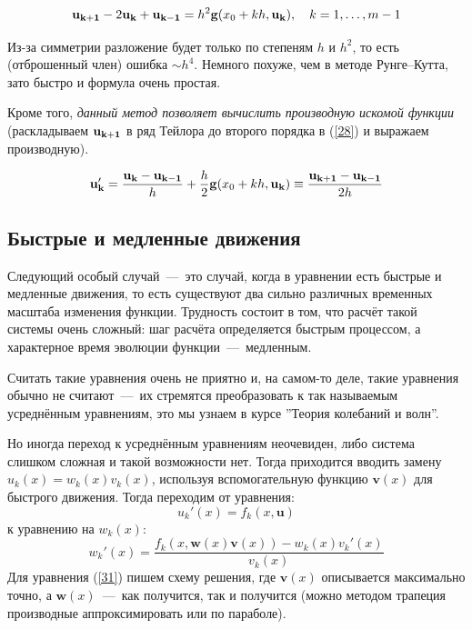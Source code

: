 \documentclass[a4paper,9pt,russian]{article}
\begin{document}
    \begin{equation}\label{28}
     {\bf u_{k+1}} - 2{\bf u_k} + {\bf u_{k-1}} = h^2{\bf g}(x_0 + kh, {\bf u_k}),\ \ \ k = 1, \ldots, m-1
    \end{equation}
    \par
    Из-за симметрии разложение будет только по степеням $h$ и $h^2$, то есть (отброшенный член) {ошибка $\sim h^4$. Немного похуже, чем в методе} {Рунге--Кутта, зато быстро и формула очень простая.}\par
    Кроме того, {\it данный метод позволяет вычислить производную искомой функции} (раскладываем ${\bf u_{k+1}}$ в ряд Тейлора до второго порядка в (\ref{28}) и выражаем производную).
    
    \begin{equation}
     {\bf u_{k}'} = \frac{{\bf u_k} - {\bf u_{k-1}}}h + \frac{h}2{\bf g}(x_0 + kh, {\bf u_k}) \equiv \frac{{\bf u_{k+1}} - {\bf u_{k-1}}}{2h}
     \end{equation}
    
\subsection{Быстрые и медленные движения}
    Следующий особый случай~---~это случай, когда в уравнении есть быстрые и медленные движения, то есть существуют два сильно различных временных масштаба изменения функции. Трудность состоит в том, что расчёт такой системы очень сложный: шаг расчёта определяется быстрым процессом, а характерное время эволюции функции~---~медленным.\par
    Считать такие уравнения очень не приятно и, на самом-то деле, такие уравнения обычно не считают~---~их стремятся преобразовать к так называемым усреднённым уравнениям, это мы узнаем в курсе ''Теория колебаний и волн''\cite{tkv}.\par
    Но иногда переход к усреднённым уравнениям неочевиден, либо система слишком сложная и такой возможности нет. Тогда приходится вводить замену $u_k(x)=w_k(x)v_k(x)$, используя вспомогательную функцию $\boldsymbol v(x)$ для быстрого движения. Тогда переходим от уравнения:
    \begin{equation}
     u_k'(x) = f_k(x, \boldsymbol u)
    \end{equation}
    к уравнению на $w_k(x)$:
    \begin{equation}\label{31}
     w_k'(x) = \frac{f_k(x, \boldsymbol w(x) \boldsymbol v(x)) - w_k(x)v_k'(x)}{v_k(x)}
    \end{equation}
    Для уравнения (\ref{31}) пишем схему решения, где  $\boldsymbol v(x)$ описывается максимально точно, а $\boldsymbol w(x)$~---~как получится, так и получится (можно методом трапеция производные аппроксимировать или по параболе).
\end{document}
